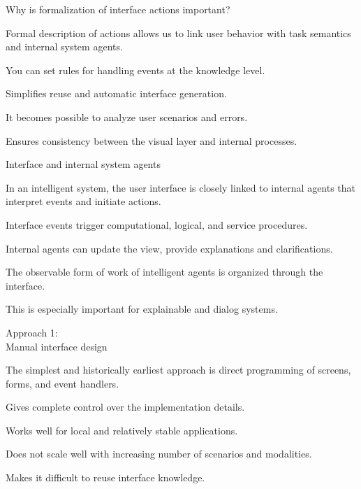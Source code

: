 \begin{frame}{Why is formalization of interface actions important?}
	\topline
	\justifying
	
	Formal description of actions allows us to link user behavior with task semantics and internal system agents.
	
	\begin{textitemize}
		\item You can set rules for handling events at the knowledge level.
		\item Simplifies reuse and automatic interface generation.
		\item It becomes possible to analyze user scenarios and errors.
		\item Ensures consistency between the visual layer and internal processes.
	\end{textitemize}
\end{frame}

\begin{frame}{Interface and internal system agents}
	\topline
	\justifying
	
	In an intelligent system, the user interface is closely linked to internal agents that interpret events and initiate actions.
	
	\begin{textitemize}
		\item Interface events trigger computational, logical, and service procedures.
		\item Internal agents can update the view, provide explanations and clarifications.
		\item The observable form of work of intelligent agents is organized through the interface.
		\item This is especially important for explainable and dialog systems.
	\end{textitemize}
\end{frame}

\begin{frame}{Approach 1:\\ Manual interface design}
	\topline
	\justifying
	
	The simplest and historically earliest approach is direct programming of screens, forms, and event handlers.
	
	\begin{textitemize}
		\item Gives complete control over the implementation details.
		\item Works well for local and relatively stable applications.
		\item Does not scale well with increasing number of scenarios and modalities.
		\item Makes it difficult to reuse interface knowledge.
	\end{textitemize}
\end{frame}


